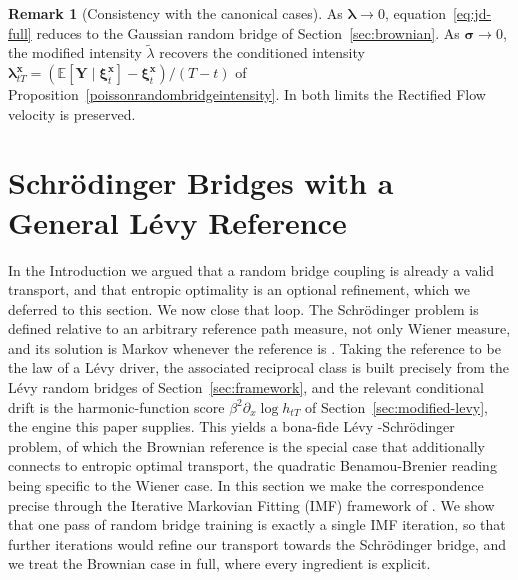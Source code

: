 \documentclass{article}
\newcommand{\levy}{{L\'evy }}
\newcommand{\Schrodinger}{Schr\"odinger\xspace}
\def\E{\mathbb{E}}
\def\xib{\boldsymbol{\xi}}
\theoremstyle{definition}
\newtheorem{remark}[proposition]{Remark}
\begin{document}
\begin{remark}[Consistency with the canonical cases]
As $\boldsymbol{\lambda}\to0$, equation~\eqref{eq:jd-full} reduces to the Gaussian random bridge of
Section~\ref{sec:brownian}. As $\boldsymbol{\sigma}\to0$, the modified intensity $\widetilde{\lambda}$
recovers the conditioned intensity
$\boldsymbol{\lambda}^{\boldsymbol{x}}_{tT}=(\E[\boldsymbol{Y}\mid\xib^{\boldsymbol{x}}_t]-\xib^{\boldsymbol{x}}_t)/(T-t)$
of Proposition~\ref{poissonrandombridgeintensity}. In both limits the Rectified Flow velocity is
preserved.
\end{remark}

\section{\Schrodinger Bridges with a General \levy Reference}\label{sec:schrodinger}
\label{sec:imf}
\label{sec:connection-imf}

In the Introduction we argued that a random bridge coupling is already a valid transport, and that entropic optimality is an optional refinement, which we deferred to this section. We now close that loop. The \Schrodinger problem is defined relative to an arbitrary reference path measure, not only Wiener measure, and its solution is Markov whenever the reference is \cite{leonard2014survey}. Taking the reference to be the law of a \levy driver, the associated reciprocal class is built precisely from the \levy random bridges of Section~\ref{sec:framework}, and the relevant conditional drift is the harmonic-function score $\beta^2\partial_x \log h_{tT}$ of Section~\ref{sec:modified-levy}, the engine this paper supplies. This yields a bona-fide \levy-\Schrodinger problem, of which the Brownian reference is the special case that additionally connects to entropic optimal transport, the quadratic Benamou-Brenier reading being specific to the Wiener case. In this section we make the correspondence precise through the Iterative Markovian Fitting (IMF) framework of \cite{shi2023diffusion}. We show that one pass of random bridge training is exactly a single IMF iteration, so that further iterations would refine our transport towards the \Schrodinger bridge, and we treat the Brownian case in full, where every ingredient is explicit.
\end{document}
